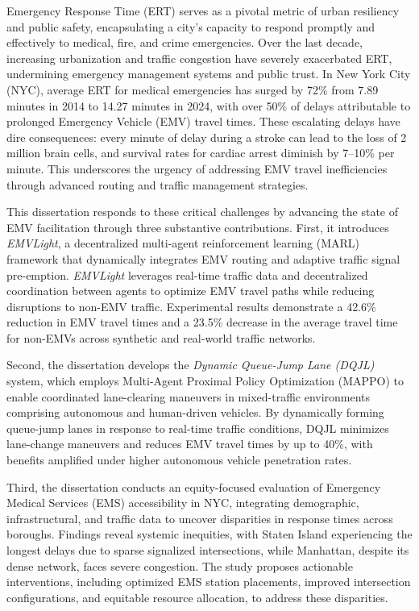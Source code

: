 Emergency Response Time (ERT) serves as a pivotal metric of urban resiliency and public safety, encapsulating a city’s capacity to respond promptly and effectively to medical, fire, and crime emergencies. Over the last decade, increasing urbanization and traffic congestion have severely exacerbated ERT, undermining emergency management systems and public trust. In New York City (NYC), average ERT for medical emergencies has surged by 72\% from 7.89 minutes in 2014 to 14.27 minutes in 2024, with over 50\% of delays attributable to prolonged Emergency Vehicle (EMV) travel times. These escalating delays have dire consequences: every minute of delay during a stroke can lead to the loss of 2 million brain cells, and survival rates for cardiac arrest diminish by 7--10\% per minute. This underscores the urgency of addressing EMV travel inefficiencies through advanced routing and traffic management strategies.

This dissertation responds to these critical challenges by advancing the state of EMV facilitation through three substantive contributions. First, it introduces \textit{EMVLight}, a decentralized multi-agent reinforcement learning (MARL) framework that dynamically integrates EMV routing and adaptive traffic signal pre-emption. \textit{EMVLight} leverages real-time traffic data and decentralized coordination between agents to optimize EMV travel paths while reducing disruptions to non-EMV traffic. Experimental results demonstrate a 42.6\% reduction in EMV travel times and a 23.5\% decrease in the average travel time for non-EMVs across synthetic and real-world traffic networks.

Second, the dissertation develops the \textit{Dynamic Queue-Jump Lane (DQJL)} system, which employs Multi-Agent Proximal Policy Optimization (MAPPO) to enable coordinated lane-clearing maneuvers in mixed-traffic environments comprising autonomous and human-driven vehicles. By dynamically forming queue-jump lanes in response to real-time traffic conditions, DQJL minimizes lane-change maneuvers and reduces EMV travel times by up to 40\%, with benefits amplified under higher autonomous vehicle penetration rates.

Third, the dissertation conducts an equity-focused evaluation of Emergency Medical Services (EMS) accessibility in NYC, integrating demographic, infrastructural, and traffic data to uncover disparities in response times across boroughs. Findings reveal systemic inequities, with Staten Island experiencing the longest delays due to sparse signalized intersections, while Manhattan, despite its dense network, faces severe congestion. The study proposes actionable interventions, including optimized EMS station placements, improved intersection configurations, and equitable resource allocation, to address these disparities.

